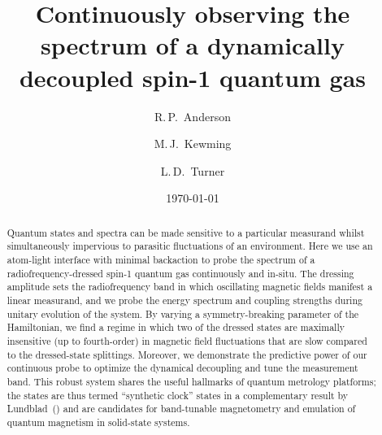 \documentclass[aps,prl,reprint,superscriptaddress,floatfix]{revtex4-1}
\begin{document}
\title{Continuously observing the spectrum of a dynamically decoupled spin-1 quantum gas}

\author{R.\,P.~Anderson}
\author{M.\,J.~Kewming }
\author{L.\,D.~Turner}

\date{\today}

\begin{abstract}
Quantum states and spectra can be made sensitive to a particular measurand whilst simultaneously impervious to parasitic fluctuations of an environment.
Here we use an atom-light interface with minimal backaction to probe the spectrum of a radiofrequency-dressed spin-1 quantum gas continuously and in-situ.
The dressing amplitude sets the radiofrequency band in which oscillating magnetic fields manifest a linear measurand, and we probe the energy spectrum and coupling strengths during unitary evolution of the system.
By varying a symmetry-breaking parameter of the Hamiltonian, we find a regime in which two of the dressed states are maximally insensitive (up to fourth-order) in magnetic field fluctuations that are slow compared to the dressed-state splittings.
Moreover, we demonstrate the predictive power of our continuous probe to optimize the dynamical decoupling and tune the measurement band.
This robust system shares the useful hallmarks of quantum metrology platforms; the states are thus termed ``synthetic clock'' states in a complementary result by Lundblad~\etal (\lundblad) and are candidates for band-tunable magnetometry and emulation of quantum magnetism in solid-state systems. 
\end{abstract}

\maketitle
\end{document}

